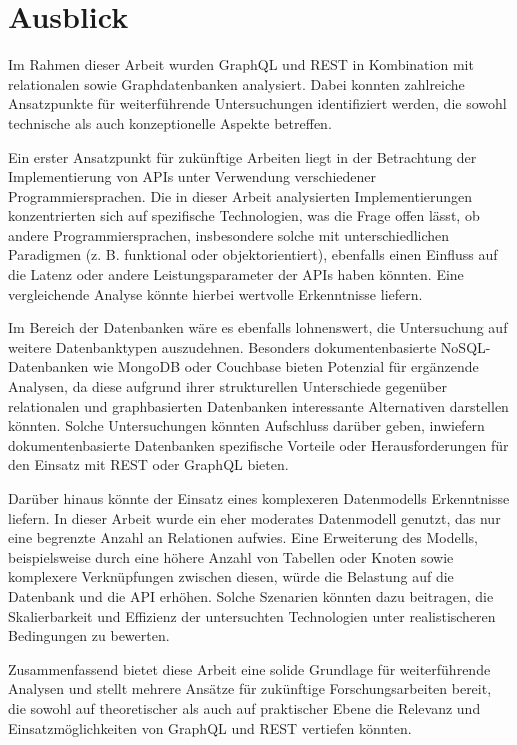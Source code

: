 \chapter{Ausblick} %
\label{sec:ausblick}
Im Rahmen dieser Arbeit wurden GraphQL und REST in Kombination mit relationalen sowie Graphdatenbanken analysiert. Dabei konnten zahlreiche Ansatzpunkte für weiterführende Untersuchungen identifiziert werden, die sowohl technische als auch konzeptionelle Aspekte betreffen.

\noindent
Ein erster Ansatzpunkt für zukünftige Arbeiten liegt in der Betrachtung der Implementierung von APIs unter Verwendung verschiedener Programmiersprachen. Die in dieser Arbeit analysierten Implementierungen konzentrierten sich auf spezifische Technologien, was die Frage offen lässt, ob andere Programmiersprachen, insbesondere solche mit unterschiedlichen Paradigmen (z. B. funktional oder objektorientiert), ebenfalls einen Einfluss auf die Latenz oder andere Leistungsparameter der APIs haben könnten. Eine vergleichende Analyse könnte hierbei wertvolle Erkenntnisse liefern.

\noindent
Im Bereich der Datenbanken wäre es ebenfalls lohnenswert, die Untersuchung auf weitere Datenbanktypen auszudehnen. Besonders dokumentenbasierte NoSQL-Datenbanken wie MongoDB oder Couchbase bieten Potenzial für ergänzende Analysen, da diese aufgrund ihrer strukturellen Unterschiede gegenüber relationalen und graphbasierten Datenbanken interessante Alternativen darstellen könnten. Solche Untersuchungen könnten Aufschluss darüber geben, inwiefern dokumentenbasierte Datenbanken spezifische Vorteile oder Herausforderungen für den Einsatz mit REST oder GraphQL bieten.

\noindent
Darüber hinaus könnte der Einsatz eines komplexeren Datenmodells Erkenntnisse liefern. In dieser Arbeit wurde ein eher moderates Datenmodell genutzt, das nur eine begrenzte Anzahl an Relationen aufwies. Eine Erweiterung des Modells, beispielsweise durch eine höhere Anzahl von Tabellen oder Knoten sowie komplexere Verknüpfungen zwischen diesen, würde die Belastung auf die Datenbank und die API erhöhen. Solche Szenarien könnten dazu beitragen, die Skalierbarkeit und Effizienz der untersuchten Technologien unter realistischeren Bedingungen zu bewerten.

\noindent
Zusammenfassend bietet diese Arbeit eine solide Grundlage für weiterführende Analysen und stellt mehrere Ansätze für zukünftige Forschungsarbeiten bereit, die sowohl auf theoretischer als auch auf praktischer Ebene die Relevanz und Einsatzmöglichkeiten von GraphQL und REST vertiefen könnten.

